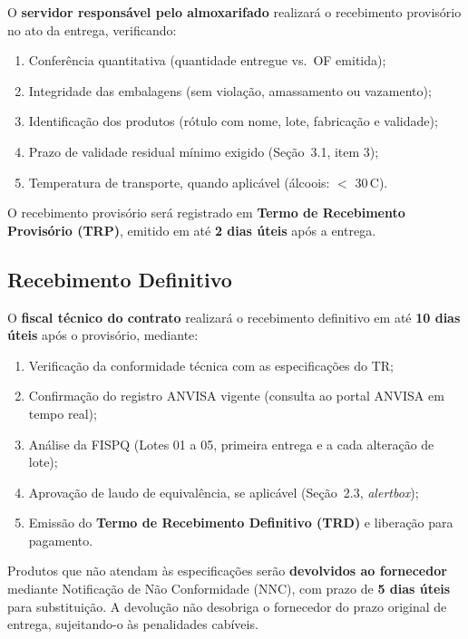 \documentclass[12pt,a4paper]{article}
\begin{document}
O \textbf{servidor responsável pelo almoxarifado} realizará o recebimento provisório
no ato da entrega, verificando:

\begin{enumerate}
  \item Conferência quantitativa (quantidade entregue vs.\ OF emitida);
  \item Integridade das embalagens (sem violação, amassamento ou vazamento);
  \item Identificação dos produtos (rótulo com nome, lote, fabricação e validade);
  \item Prazo de validade residual mínimo exigido (Seção~3.1, item 3);
  \item Temperatura de transporte, quando aplicável (álcoois: $<$ 30\,\textdegree C).
\end{enumerate}

O recebimento provisório será registrado em \textbf{Termo de Recebimento Provisório
(TRP)}, emitido em até \textbf{2 dias úteis} após a entrega.

\subsection{Recebimento Definitivo}

O \textbf{fiscal técnico do contrato} realizará o recebimento definitivo em até
\textbf{10 dias úteis} após o provisório, mediante:

\begin{enumerate}
  \item Verificação da conformidade técnica com as especificações do TR;
  \item Confirmação do registro ANVISA vigente (consulta ao portal ANVISA em tempo real);
  \item Análise da FISPQ (Lotes 01 a 05, primeira entrega e a cada alteração de lote);
  \item Aprovação de laudo de equivalência, se aplicável (Seção~2.3, \textit{alertbox});
  \item Emissão do \textbf{Termo de Recebimento Definitivo (TRD)} e liberação para pagamento.
\end{enumerate}

\begin{alertbox}
\small
Produtos que não atendam às especificações serão \textbf{devolvidos ao fornecedor}
mediante Notificação de Não Conformidade (NNC), com prazo de \textbf{5 dias úteis}
para substituição. A devolução não desobriga o fornecedor do prazo original de
entrega, sujeitando-o às penalidades cabíveis.
\end{alertbox}
\end{document}
